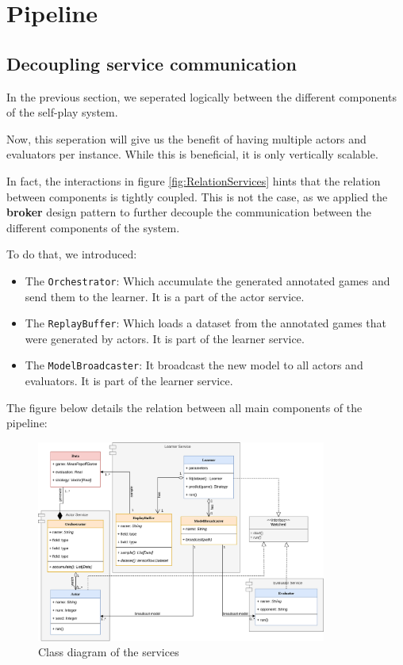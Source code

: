 \section{Pipeline}
\subsection{Decoupling service communication}
In the previous section, we seperated logically between the different components of the self-play system.

Now, this seperation will give us the benefit of having multiple actors and evaluators per instance. While this is beneficial, it is only vertically scalable.

In fact, the interactions in figure \ref{fig:RelationServices} hints that the relation between components is tightly coupled. This is not the case, as we applied the \textbf{broker} design pattern to further decouple the communication between the different components of the system.

To do that, we introduced:
\begin{itemize}
	\item The \texttt{Orchestrator}: Which accumulate the generated annotated games and send them to the learner. It is a part of the actor service.
	\item The \texttt{ReplayBuffer}: Which loads a dataset from the annotated games that were generated by actors. It is part of the learner service.
	\item The \texttt{ModelBroadcaster}: It broadcast the new model to all actors and evaluators. It is part of the learner service.
\end{itemize}
The figure below details the relation between all main components of the pipeline:

\begin{figure}[H]
	\centering
	\includegraphics[width=0.85\textwidth]{Figures/ServiceDiagram.png}
	\caption{Class diagram of the services}
\end{figure}
\FloatBarrier
